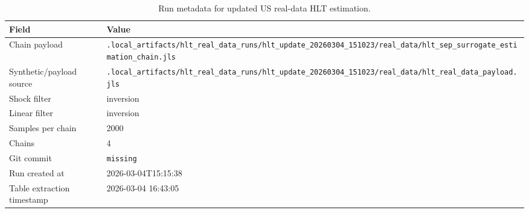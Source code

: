 \begin{table}[htbp]
\centering
\caption{Run metadata for updated US real-data HLT estimation.}
\label{tab:realdata_runmeta}
\begin{tabular}{ll}
\toprule
Field & Value \\
\midrule
Chain payload & \texttt{.local\_artifacts/hlt\_real\_data\_runs/hlt\_update\_20260304\_151023/real\_data/hlt\_sep\_surrogate\_estimation\_chain.jls} \\
Synthetic/payload source & \texttt{.local\_artifacts/hlt\_real\_data\_runs/hlt\_update\_20260304\_151023/real\_data/hlt\_real\_data\_payload.jls} \\
Shock filter & inversion \\
Linear filter & inversion \\
Samples per chain & 2000 \\
Chains & 4 \\
Git commit & \texttt{missing} \\
Run created at & 2026-03-04T15:15:38 \\
Table extraction timestamp & 2026-03-04 16:43:05 \\
\bottomrule
\end{tabular}
\end{table}
